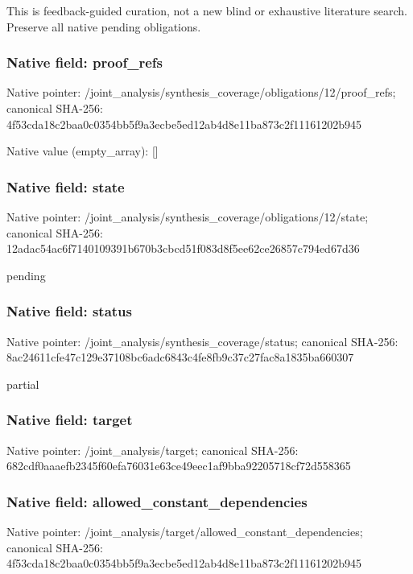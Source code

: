 \documentclass[10pt,a4paper]{article}
\begin{document}
\begingroup\raggedright\sloppy This is feedback-guided curation,\allowbreak{} not a new blind or exhaustive literature search. Preserve all native pending obligations.\par\endgroup

\subsubsection{Native field: proof\_\allowbreak{}refs}
Native pointer: /joint\_\allowbreak{}analysis/synthesis\_\allowbreak{}coverage/obligations/12/proof\_\allowbreak{}refs; canonical SHA-256: 4f53cda18c2baa0c0354bb5f9a3ecbe5ed12ab4d8e11ba873c2f11161202b945

Native value (empty\_\allowbreak{}array): []

\subsubsection{Native field: state}
Native pointer: /joint\_\allowbreak{}analysis/synthesis\_\allowbreak{}coverage/obligations/12/state; canonical SHA-256: 12adac54ac6f7140109391b670b3cbcd51f083d8f5ee62ce26857c794ed67d36

\begingroup\raggedright\sloppy pending\par\endgroup

\subsubsection{Native field: status}
Native pointer: /joint\_\allowbreak{}analysis/synthesis\_\allowbreak{}coverage/status; canonical SHA-256: 8ac24611cfe47c129e37108bc6adc6843c4fe8fb9c37c27fac8a1835ba660307

\begingroup\raggedright\sloppy partial\par\endgroup

\subsubsection{Native field: target}
Native pointer: /joint\_\allowbreak{}analysis/target; canonical SHA-256: 682cdf0aaaefb2345f60efa76031e63ce49eec1af9bba92205718cf72d558365

\subsubsection{Native field: allowed\_\allowbreak{}constant\_\allowbreak{}dependencies}
Native pointer: /joint\_\allowbreak{}analysis/target/allowed\_\allowbreak{}constant\_\allowbreak{}dependencies; canonical SHA-256: 4f53cda18c2baa0c0354bb5f9a3ecbe5ed12ab4d8e11ba873c2f11161202b945
\end{document}
